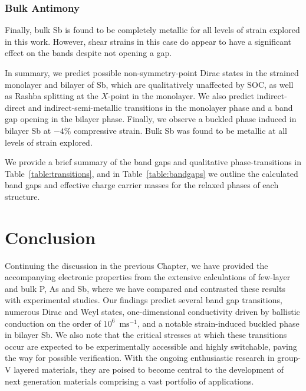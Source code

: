 \subsubsection{Bulk Antimony}
Finally, bulk Sb is 
found to be completely metallic 
for all levels of strain explored in this work.
%
However, shear strains in this case 
do appear to have a significant
effect on the bands despite not opening a gap.


In summary, 
we predict possible non-symmetry-point 
Dirac {states} in the strained monolayer {and bilayer} of Sb, 
which are qualitatively unaffected by SOC, 
as well as Rashba splitting at the $X$-point 
{in the monolayer}.
%
We also predict 
indirect-direct and indirect-semi-metallic 
transitions in the monolayer phase 
and a band gap opening in the bilayer phase.
%
Finally, we observe a 
buckled phase induced in bilayer Sb 
at $-4\%$ compressive strain.
%
Bulk Sb was found to be metallic 
at all levels of strain explored.

We provide a brief summary  
of the band gaps and qualitative phase-transitions 
in Table~\ref{table:transitions}, 
and in Table~\ref{table:bandgaps} 
we outline the calculated 
band gaps and effective 
charge carrier masses 
for the relaxed phases of each structure.
%

\section{Conclusion}
\label{sec:2d_conclusion2}

Continuing the discussion in the previous Chapter, 
we have provided the accompanying electronic properties 
from the extensive calculations 
of few-layer and bulk P, As and Sb, 
where we have compared and contrasted 
these results with experimental studies.
%
Our findings predict several band gap transitions, 
numerous Dirac and Weyl states, 
one-dimensional conductivity 
driven by ballistic conduction 
on the order of $10^6$~$\textrm{ms}^{-1}$, 
and a notable strain-induced 
buckled phase in bilayer Sb.
%
We also note that the critical stresses 
at which these transitions occur 
are expected to be experimentally 
accessible and highly switchable, 
paving the way for possible 
verification.
%
With the ongoing enthusiastic research 
in group-V layered materials, 
they are poised to become central to 
the development of next generation materials 
comprising a vast portfolio of applications.


